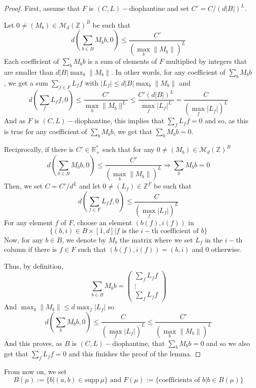 \documentclass[11pt]{amsart}
\theoremstyle{definition}
\theoremstyle{remark}
\numberwithin{equation}{section}
\begin{document}
\begin{proof}
First, assume that $F$ is $(C,L)-$diophantine and set $C'= C/(d|B|)^L$.

Let $0\not=(M_b) \in \mathcal{M}_d({\mathbb Z})^B$ be such that
\[
d(\sum_{b\in B} M_b b,0) \leqslant \frac{C'}{(\max_b \|M_b\|)^L}
\]
Each coefficient of $\sum_b M_bb$ is a sum of elements of $F$ multiplied by integers that are smaller than $d |B| \max_b \|M_b\|$. In other words, for any coefficient of $\sum_b M_bb$, we get a sum $\sum_{f\in F} L_ff$ with $|L_f| \leqslant d|B| \max_b \|M_b\|$ and
\[
d\left( \sum_f L_ff,0\right) \leqslant \frac {C'}{\max_b \|M_b\|^L} \leqslant \frac{C'(d|B|)^L}{\max_{f}|L_f|^L} = \frac{C}{(\max_f |L_f|)^L}
\]
And as $F$ is $(C,L)-$diophantine, this implies that $\sum_f L_ff=0$ and so, as this is true for any coefficient of $\sum_b M_bb$, we get that $\sum_b M_bb=0$.

Reciprocally, if there is $C' \in {\mathbb R}_+^\ast$ such that for any $0\not=(M_b) \in \mathcal{M}_d({\mathbb Z})^B$ 
\[
d\left(\sum_{b\in B} M_bb,0\right) \leqslant \frac{C'}{(\max_b \|M_b\|)^L} \Rightarrow \sum_b M_bb=0
\]
Then, we set $C= C'/d^L$ and let $0\not=(L_f) \in {\mathbb Z}^F$ be such that
\[
d\left(\sum_{f\in F}L_ff,0\right) \leqslant \frac{ C}{(\max_f |L_f|)^L}
\]
For any element $f$ of $F$, choose an element $(b(f),i(f))$ in 
\[
\{(b,i) \in B\times [1,d] | f\text{ is the }i-\text{th coefficient of }b \}
\]
Now, for any $b\in B$, we denote by $M_b$ the matrix where we set $L_f$ in the $i-$th column if there is $f\in F$ such that $(b(f),i(f)) = (b,i)$ and $0$ otherwise.

Thus, by definition,
\[
\sum_{b\in B} M_bb = \left(\begin{array}{c}
\sum_f L_ff\\ \vdots \\\sum_f L_ff
\end{array} \right)
\]
And $\max_b \|M_b\|\leqslant d \max_f |L_f|$ so
\[
d\left(\sum_b M_bb,0\right) \leqslant \frac{ C}{(\max_f|L_f|)^L} \leqslant \frac{ C'}{(\max_b\|M_b\|)^L}
\]
And this proves, as $B$ is $(C,L)-$diophantine, that $\sum_b M_bb=0$ and so we also get that $\sum_f L_f f=0$ and this finishes the proof of the lemma.
\end{proof}

From now on, we set
\begin{equation}\label{equation:BmuFmu}
B(\mu):=\{b| (a,b)\in {\mathrm{supp}\,}\mu\} \text{ and }F(\mu):=\{ \text{coefficients of }b|b\in B(\mu)\}
\end{equation}
\end{document}
